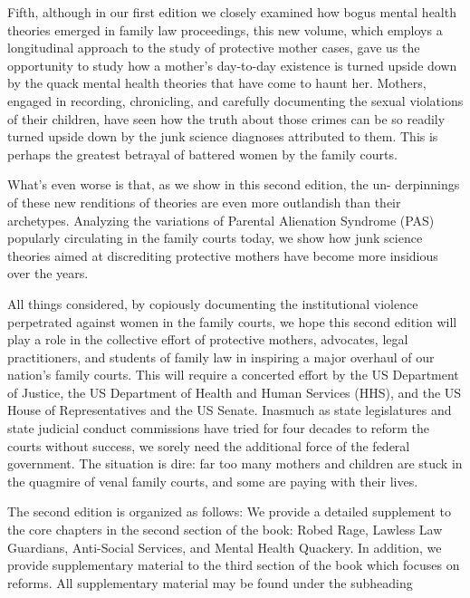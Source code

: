 Fifth, although in our first edition we closely examined how bogus
mental health theories emerged in family law proceedings, this new 
volume, which employs a longitudinal approach to the study of protective
mother cases, gave us the opportunity to study how a mother's 
day-to-day existence is turned upside down by the quack mental health theories
that have come to haunt her. Mothers, engaged in recording, 
chronicling, and carefully documenting the sexual violations of their children,
have seen how the truth about those crimes can be so readily turned
upside down by the junk science diagnoses attributed to them. This is
perhaps the greatest betrayal of battered women by the 
family courts. \pfl{}

What's even worse is that, as we show in this second edition, the un-
derpinnings of these new renditions of  theories are
even more outlandish than their archetypes. Analyzing the variations of
Parental Alienation Syndrome (PAS) popularly circulating in the family
courts today, we show how junk science theories aimed at discrediting
protective mothers have become more insidious over the years. \pfl{}

All things considered, by copiously documenting the institutional 
violence perpetrated against women in the family courts, we hope this
second edition will play a role in the collective effort of protective
mothers, advocates, legal practitioners, and students of family law in 
inspiring a major overhaul of our nation’s family courts. This will require
a concerted effort by the US Department of Justice, the US Department
of Health and Human Services (HHS), and the US House of 
Representatives and the US Senate. 
Inasmuch as state legislatures and state judicial
conduct commissions have tried for four decades to reform the courts
without success, we sorely need the additional force of the federal 
government. The situation is dire: far too many mothers and children are
stuck in the quagmire of venal family courts, and some are paying with
their lives. \pfl{}

The second edition is organized as follows: We provide a detailed
supplement to the core chapters in the second section of the book:
Robed Rage, Lawless Law Guardians, Anti-Social Services, and Mental
Health Quackery. In addition, we provide supplementary material to the
third section of the book which focuses on reforms. All supplementary
material may be found under the subheading  \pfl{}




